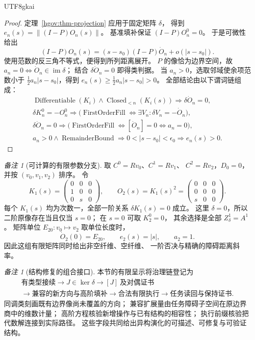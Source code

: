 \documentclass[12pt,a4paper,openany,notitlepage]{report}
\theoremstyle{plain}
\theoremstyle{definition}
\theoremstyle{remark}
\newtheorem{remark}[theorem]{备注}
\def\mathcal#1{#1}\def\mathsf#1{#1}\def\mathbb#1{#1}%
\begin{document}
\begin{CJK*}{UTF8}{gkai}
\begin{proof}
定理~\ref{hgov:thm-projection} 应用于固定矩阵 $\delta$，
得到 $e_n(s)=\|(I-P)O_n(s)\|$。
基准填补保证 $(I-P)O_n^0=0$。
于是可微性给出
\[
 (I-P)O_n(s)
 =(s-s_0)(I-P)\dot O_n+o(|s-s_0|).
\]
使用范数的反三角不等式，便得到所列距离展开。
$P$ 的像恰为边界空间，故
$a_n=0\Longleftrightarrow\dot O_n\in\operatorname{im}\delta$；
结合 $\delta\dot O_n=0$ 即得类判据。
当 $a_n>0$，选取邻域使余项范数小于
$\frac12 a_n|s-s_0|$，得到
$e_n(s)\ge\frac12a_n|s-s_0|>0$。
全部结论由以下谓词链组成：
\[
 \begin{gathered}
 \operatorname{Differentiable}(K_i)\land
 \operatorname{Closed}_{<n}(K_i(s))
 \Rightarrow\delta\dot O_n=0,\\
 \delta K_n^0=-O_n^0
 \Rightarrow
 \bigl(\operatorname{FirstOrderFill}
       \Longleftrightarrow\exists V_n:\delta V_n=-\dot O_n\bigr),\\
 \delta\dot O_n=0
 \Rightarrow
 \bigl(\operatorname{FirstOrderFill}
       \Longleftrightarrow[\dot O_n]=0
       \Longleftrightarrow a_n=0\bigr),\\
 a_n>0\land\operatorname{RemainderBound}
 \Rightarrow
 0<|s-s_0|<\epsilon_0\Rightarrow e_n(s)>0.
 \end{gathered}
\]
\end{proof}

\begin{remark}[可计算的有限参数分支]
\label{exp:hom:parameter-matrix}
取 $C^0=\mathbb R v_0$、$C^1=\mathbb R v_1$、
$C^2=\mathbb R v_2$，$D_0=0$，并按 $(v_0,v_1,v_2)$ 排序。
令
\[
 K_1(s)=
 \begin{pmatrix}0&0&0\\1&0&0\\0&s&0\end{pmatrix},
 \qquad
 O_2(s)=K_1(s)^2=
 \begin{pmatrix}0&0&0\\0&0&0\\s&0&0\end{pmatrix}.
\]
每个 $K_1(s)$ 均为次数一，全部一阶关系 $\delta K_1(s)=0$ 成立。
这里 $\delta=0$，所以二阶原像存在当且仅当 $s=0$；
在 $s=0$ 可取 $K_2^0=0$，
其余选择是全部 $Z^1_\delta=\mathcal A^1$。
矩阵单位 $E_{20}:v_0\mapsto v_2$ 取单位长度时，
\[
 \dot O_2(0)=E_{20},\qquad
 e_2(s)=|s|,\qquad a_2=1.
\]
因此这组有限矩阵同时给出非空纤维、空纤维、
一阶否决与精确的障碍距离斜率。
\end{remark}

\begin{remark}[结构修复的组合接口]
\label{hgov:rem-interface}
本节的有限呈示将治理链登记为
\[
 \begin{gathered}
 \text{有类型接续}
 \longrightarrow J\in\ker\delta
 \longrightarrow[J]\ \text{及对偶证书}\\
 \longrightarrow
 \text{兼容的新方向与高阶填补}
 \longrightarrow
 \text{合法有限执行}
 \longrightarrow
 \text{任务读回与保持证书}.
 \end{gathered}
\]
同调类刻画既有边界像尚未覆盖的方向；
兼容扩展量由任务障碍子空间在原边界商中的维数计量；
高阶方程核验新增操作与已有结构的相容性；
执行前缀核验把代数解连接到实际路径。
这些字段共同给出异构演化的可描述、可修复与可验证结构。
\end{remark}



\end{CJK*}
\end{document}
